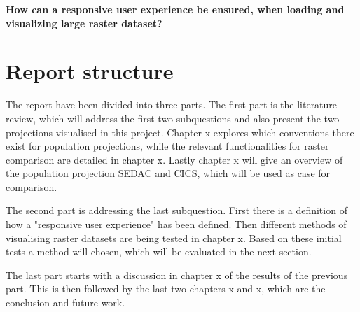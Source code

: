 \textbf{How can a responsive user experience be ensured, when loading and visualizing large raster dataset?}


\section{Report structure}

The report have been divided into three parts. The first part is the literature review, which will address the first two subquestions and also present the two projections visualised in this project. Chapter x explores which conventions there exist for population projections, while the relevant functionalities for raster comparison are detailed in chapter x. Lastly chapter x will give an overview of the population projection SEDAC and CICS, which will be used as case for comparison.

The second part is addressing the last subquestion. First there is a definition of how a "responsive user experience" has been defined. Then different methods of visualising raster datasets are being tested in chapter x. Based on these initial tests a method will chosen, which will be evaluated in the next section.

The last part starts with a discussion in chapter x of the results of the previous part. This is then followed by the last two chapters x and x, which are the conclusion and future work.  

%
%
